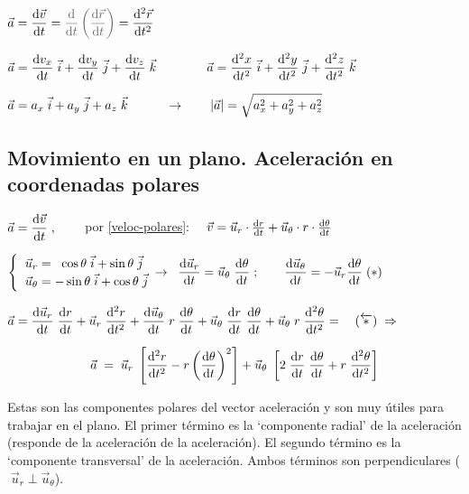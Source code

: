 $\displaystyle \vec a=\dv{\vec v}{t}=\textcolor{gris}{
\dv{t}\left( \dv{\vec r}{t}  \right)
}=\dv[2]{\vec r}{t}$

$\displaystyle 
\vec a=\dv{v_x}{t}\;\vec i+\dv{v_y}{t}\;\vec j+\dv{v_z}{t}\;\vec k
\qquad \qquad
\vec a= \dv[2]{x}{t}\;\vec i+\dv[2]{y}{t}\;\vec j+\dv[2]{z}{t}\;\vec k$

$\displaystyle \vec a=a_x\;\vec i+a_y\;\vec j+a_z\;\vec k \quad \qquad \to \qquad \abs{\vec a}=\sqrt{a_x^2+a_y^2+a_z^2}$

 \subsection{Movimiento en un plano.  Aceleración en coordenadas polares}

$\displaystyle \vec a=\dv{\vec v}{t}\;,\qquad$
por \ref{veloc-polares}: $\quad \vec v=\vec u_r \cdot \dv{r}{t} + \vec u_\theta \cdot r\cdot \dv{\theta}{t} $

$\begin{cases} \;\;\vec u_r=\;\;\cos \theta\; \vec i + \sin \theta\; \vec j \\  \;\;\vec u_\theta = -\sin \theta \; \vec i + \cos \theta \;\vec j \end{cases}  \hspace{-3mm} \to \;\;
\displaystyle \dv{\vec u_r}{t}=\vec u_\theta\; \dv{\theta}{t}\;;  \qquad 
\displaystyle \dv{\vec u_\theta}{t}=-\vec u_r \dv{\theta}{t}\; (*)$




$\displaystyle \vec a =\dv{\vec u_r}{t}\; \dv{r}{t} 
+ \vec u_r\; \dv[2]{r}{t} 
+ \dv{\vec u_\theta}{t}\;r\;\dv{\theta}{t}
+\vec u_\theta\;\dv{r}{t}\;\dv{\theta}{t}
+\vec u_\theta\;r\;\dv[2]{\theta}{t}= \quad (\overleftarrow{*}) \; \Rightarrow$

\begin{equation}
\label{aceleracionpolares}	
\displaystyle \vec a\;=\;\vec u_r\;\left[ \dv[2]{r}{t}-r\left(\dv{\theta}{t} \right)^2 \right] + \vec u_\theta \; \left[ 2\;\dv{r}{t}\;\dv{\theta}{t}+r\;\dv[2]{\theta}{t} \right]
\end{equation}

Estas son las componentes polares del vector aceleración y son muy útiles para trabajar en el plano. El primer término es la `componente radial' de la aceleración (responde de la aceleración de la aceleración). El segundo término es la `componente transversal' de la aceleración. Ambos términos son perpendiculares ($\;\vec u_r\;\bot\;\vec u_\theta$). 

